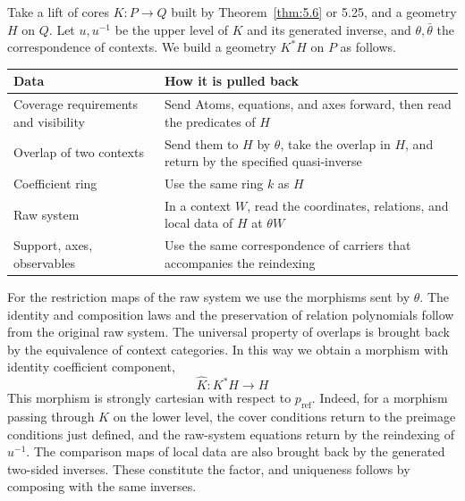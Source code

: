 \begin{construction}\label{cons:5.31}

Take a lift of cores $K:P\to Q$ built by Theorem~\ref{thm:5.6} or 5.25, and a geometry $H$
on $Q$. Let $u,u^{-1}$ be the upper level of $K$ and its generated inverse, and
$\theta,\bar\theta$ the correspondence of contexts. We build a geometry $K^*H$ on $P$ as
follows.

\begin{xltabular}{\linewidth}{@{}LL@{}}
\toprule
Data & How it is pulled back \\
\midrule
\endhead
Coverage requirements and visibility & Send Atoms, equations, and axes forward, then read
the predicates of $H$ \\
\addlinespace[3pt]
Overlap of two contexts & Send them to $H$ by $\theta$, take the overlap in $H$, and return
by the specified quasi-inverse \\
\addlinespace[3pt]
Coefficient ring & Use the same ring $k$ as $H$ \\
\addlinespace[3pt]
Raw system & In a context $W$, read the coordinates, relations, and local data of $H$ at
$\theta W$ \\
\addlinespace[3pt]
Support, axes, observables & Use the same correspondence of carriers that accompanies the
reindexing \\
\bottomrule
\end{xltabular}

For the restriction maps of the raw system we use the morphisms sent by $\theta$. The
identity and composition laws and the preservation of relation polynomials follow from the
original raw system. The universal property of overlaps is brought back by the equivalence
of context categories. In this way we obtain a morphism with identity coefficient
component,
\begin{equation*}
\widehat K:K^*H\longrightarrow H
\tag{5.35}\label{eq:5.35}
\end{equation*}
This morphism is strongly cartesian with respect to $p_{\mathrm{ref}}$. Indeed, for a
morphism passing through $K$ on the lower level, the cover conditions return to the
preimage conditions just defined, and the raw-system equations return by the reindexing of
$u^{-1}$. The comparison maps of local data are also brought back by the generated
two-sided inverses. These constitute the factor, and uniqueness follows by composing with
the same inverses.

\end{construction}

